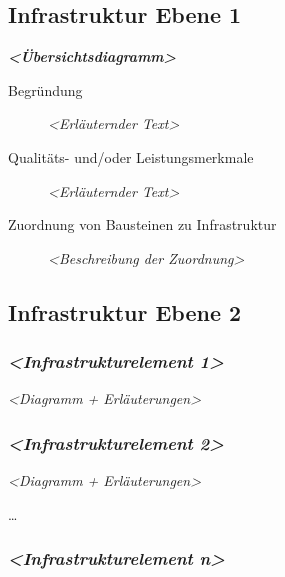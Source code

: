 \documentclass[
]{article}
\begin{document}
\hypertarget{_infrastruktur_ebene_1}{%
  \subsection{Infrastruktur Ebene 1}\label{_infrastruktur_ebene_1}}

\emph{\textbf{\textless Übersichtsdiagramm\textgreater{}}}

\begin{description}
  \item[Begründung]
    \emph{\textless Erläuternder Text\textgreater{}}
  \item[Qualitäts- und/oder Leistungsmerkmale]
    \emph{\textless Erläuternder Text\textgreater{}}
  \item[Zuordnung von Bausteinen zu Infrastruktur]
    \emph{\textless Beschreibung der Zuordnung\textgreater{}}
\end{description}

\hypertarget{_infrastruktur_ebene_2}{%
  \subsection{Infrastruktur Ebene 2}\label{_infrastruktur_ebene_2}}

\hypertarget{__emphasis_infrastrukturelement_1_emphasis}{%
  \subsubsection{\texorpdfstring{\emph{\textless Infrastrukturelement
        1\textgreater{}}}{\textless Infrastrukturelement 1\textgreater{}}}\label{__emphasis_infrastrukturelement_1_emphasis}}

\emph{\textless Diagramm + Erläuterungen\textgreater{}}

\hypertarget{__emphasis_infrastrukturelement_2_emphasis}{%
  \subsubsection{\texorpdfstring{\emph{\textless Infrastrukturelement
        2\textgreater{}}}{\textless Infrastrukturelement 2\textgreater{}}}\label{__emphasis_infrastrukturelement_2_emphasis}}

\emph{\textless Diagramm + Erläuterungen\textgreater{}}

\ldots{}

\hypertarget{__emphasis_infrastrukturelement_n_emphasis}{%
  \subsubsection{\texorpdfstring{\emph{\textless Infrastrukturelement
        n\textgreater{}}}{\textless Infrastrukturelement n\textgreater{}}}\label{__emphasis_infrastrukturelement_n_emphasis}}
\end{document}
